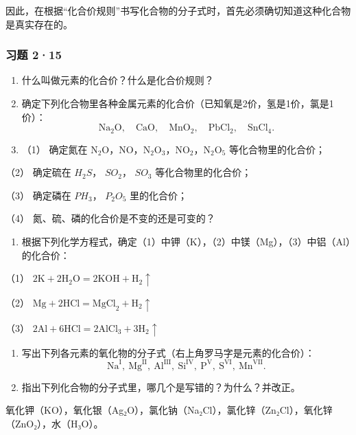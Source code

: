 因此，在根据``化合价规则''书写化合物的分子式时，首先必须确切知道这种化合物是真实存在的。

\subsubsection{习题 2·15}

\begin{enumerate}
\item
  什么叫做元素的化合价？什么是化合价规则？
\item
  确定下列化合物里各种金属元素的化合价（已知氧是2价，氢是1价，氯是1价）：
\[
\mathrm{Na}_{2} \mathrm{O}, \quad \mathrm{CaO}, \quad \mathrm{MnO}_{2}, \quad \mathrm{PbCl}_{2}, \quad \mathrm{SnCl}_{4}.
\]
\item
  （1） 确定氮在
  \(\mathrm{N_2O}\)，NO，\(\mathrm{N_2O_3}\)，\(\mathrm{NO_2}\)，\(\mathrm{N_2O_5}\)
  等化合物里的化合价；
\end{enumerate}

（2） 确定硫在 \(H_{2}S\)， \(SO_{2}\)， \(SO_{3}\) 等化合物里的化合价；

（3） 确定磷在 \(PH_{3}\)， \(P_{2}O_{5}\) 里的化合价；

（4） 氮、硫、磷的化合价是不变的还是可变的？

\begin{enumerate}[start=4]
\item
  根据下列化学方程式，确定（1）中钾（K），（2）中镁（Mg），（3）中铝（Al）的化合价：
\end{enumerate}

（1）
\(2\mathrm{K} + 2\mathrm{H}_2\mathrm{O} = 2\mathrm{KOH} + \mathrm{H}_2\uparrow\)

（2）
\(\mathrm{Mg} + 2\mathrm{HCl} = \mathrm{MgCl}_2 + \mathrm{H}_2\uparrow\)

（3）
\(2\mathrm{Al} + 6\mathrm{HCl} = 2\mathrm{AlCl}_3 + 3\mathrm{H}_2\uparrow\)

\begin{enumerate}[start=5]
\item
  写出下列各元素的氧化物的分子式（右上角罗马字是元素的化合价）：
\[
\mathrm{Na}^{\mathrm{I}},\ \mathrm{Mg}^{\mathrm{II}},\ \mathrm{Al}^{\mathrm{III}},\ \mathrm{Si}^{\mathrm{IV}},\ \mathrm{P}^{\mathrm{V}},\ \mathrm{S}^{\mathrm{VI}},\ \mathrm{Mn}^{\mathrm{VII}}.
\]
\item
  指出下列化合物的分子式里，哪几个是写错的？为什么？并改正。
\end{enumerate}

氧化钾（KO），氧化银（Ag₂O），氯化钠（Na₂Cl），氯化锌（Zn₂Cl），氧化锌（ZnO₂），水（H₃O）。

